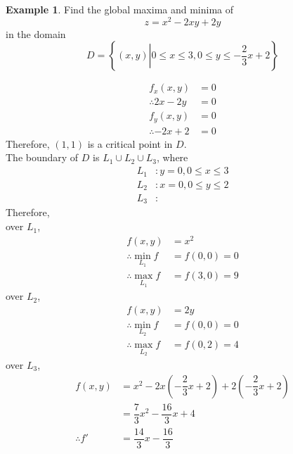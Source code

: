 \documentclass[fleqn, a4paper, 12pt, twoside]{article}
\theoremstyle{definition}
\newtheorem{example}{Example}
\theoremstyle{theorem}
\begin{document}
{\begin{example}
	Find the global maxima and minima of
	\begin{equation*}
		z = x^2 - 2xy + 2y
	\end{equation*}
	in the domain
	\begin{equation*}
		D = 
		\left\lbrace
			(x,y) \left| 0 \leq x \leq 3, 0 \leq y \leq -\dfrac{2}{3} x + 2 \right.
		\right\rbrace
	\end{equation*}
\end{example}

\begin{solution}
	\begin{align*}
		f_x(x,y)           & = 0 \\
		\therefore 2x - 2y & = 0 \\
		f_y(x,y)           & = 0 \\
		\therefore -2x + 2 & = 0
	\end{align*}
	Therefore, $(1,1)$ is a critical point in $D$.\\
	The boundary of $D$ is $L_1 \cup L_2 \cup L_3$, where
	\begin{align*}
		L_1 &: y = 0, 0 \leq x \leq 3\\
		L_2 &: x = 0, 0 \leq y \leq 2\\
		L_3 &:
	\end{align*}
	Therefore,\\
	over $L_1$,
	\begin{align*}
		f(x,y) &= x^2\\
		\therefore \min_{L_1} f & = f(0,0) = 0 \\
		\therefore \max_{L_1} f & = f(3,0) = 9
	\end{align*}
		over $L_2$,
	\begin{align*}
		f(x,y) &= 2y\\
		\therefore \min_{L_2} f & = f(0,0) = 0 \\
		\therefore \max_{L_2} f & = f(0,2) = 4
	\end{align*}
		over $L_3$,
	\begin{align*}
		f(x,y)                                                & = x^2 - 2x \left(-\dfrac{2}{3} x + 2\right) + 2 \left(-\dfrac{2}{3} x + 2\right) \\
                                                                      & = \dfrac{7}{3} x^2 - \dfrac{16}{3} x + 4                                         \\
		\therefore f'                                         & = \dfrac{14}{3} x - \dfrac{16}{3}                                                \\

\end{align*}
\end{solution}}
\end{document}
